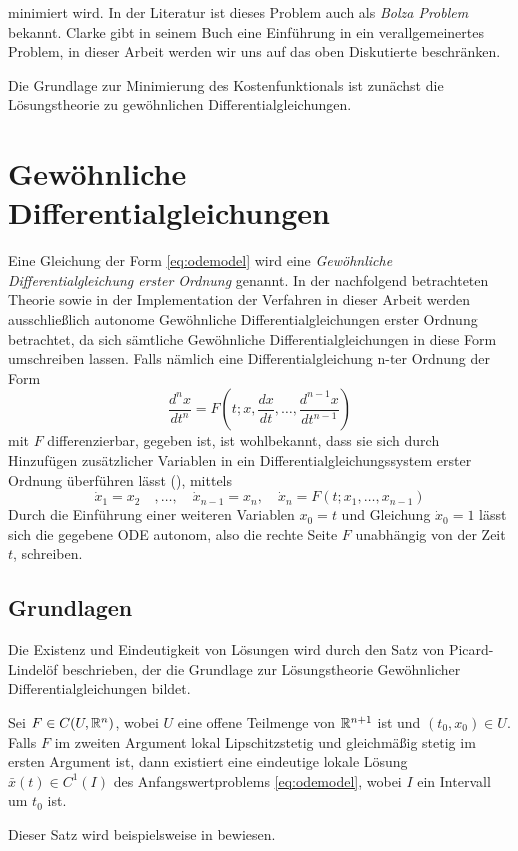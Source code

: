 minimiert wird. 
In der Literatur ist dieses Problem auch als \textit{Bolza Problem} bekannt. Clarke gibt in seinem Buch \cite[S. 165 ff]{clarke1990optimization} eine Einführung in ein verallgemeinertes Problem, in dieser Arbeit werden wir uns auf das oben Diskutierte beschränken.

Die Grundlage zur Minimierung des Kostenfunktionals ist zunächst die Lösungstheorie zu gewöhnlichen Differentialgleichungen.

\section{Gewöhnliche Differentialgleichungen}
Eine Gleichung der Form \eqref{eq:odemodel} wird eine \textit{Gewöhnliche Differentialgleichung erster Ordnung} genannt. 
In der nachfolgend betrachteten Theorie sowie in der Implementation der Verfahren in dieser Arbeit werden ausschließlich autonome Gewöhnliche Differentialgleichungen erster Ordnung betrachtet, da sich sämtliche Gewöhnliche Differentialgleichungen in diese Form umschreiben lassen.
Falls nämlich eine Differentialgleichung n-ter Ordnung der Form 
\[
 \frac{d^n x}{dt^n}= F\left(t;x,\frac{dx}{dt},\ldots,\frac{d^{n-1} x}{dt^{n-1}}\right)
\]
mit $F$ differenzierbar, gegeben ist, ist wohlbekannt, dass sie sich durch Hinzufügen zusätzlicher Variablen in ein Differentialgleichungssystem erster Ordnung überführen lässt (\cite[S. 105]{arnold2001grundbegriffe}), mittels
\[
 \dot x_1 = x_2 \quad ,\ldots,\quad \dot x_{n-1} = x_n, \quad  \dot x_n = F(t;x_1,\ldots,x_{n-1})
\]
Durch die Einführung einer weiteren Variablen $x_0 = t$ und Gleichung $\dot x_0=1$ lässt sich die gegebene ODE autonom, also die rechte Seite $F$ unabhängig von der Zeit $t$, schreiben.
\subsection{Grundlagen}
Die Existenz und Eindeutigkeit von Lösungen wird durch den Satz von Picard-Lindelöf beschrieben, der die Grundlage zur Lösungstheorie Gewöhnlicher Differentialgleichungen bildet.
\begin{theorem}
\label{thm:picard-lindeloeff}
 Sei $F\in C(U,\mathbb{R}^n)$, wobei $U$ eine offene Teilmenge von $\mathbb{R}^{n+1}$ ist und $(t_0,x_0)\in U$. Falls $F$ im zweiten Argument lokal Lipschitzstetig und gleichmäßig stetig im ersten Argument ist, dann existiert eine eindeutige lokale Lösung $\bar x(t)\in C^1(I)$ des Anfangswertproblems \eqref{eq:odemodel}, wobei $I$ ein Intervall um $t_0$ ist.
\end{theorem}
 Dieser Satz wird beispielsweise in \cite{teschl2012ordinary} bewiesen. 
% 


